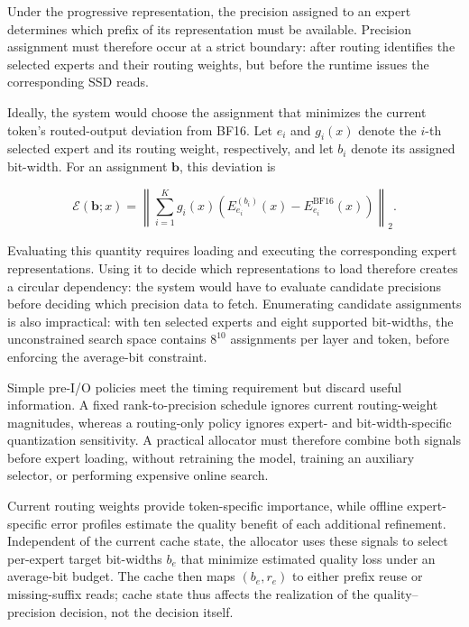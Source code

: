 \documentclass[sigconf, nonacm]{acmart}
\begin{document}
Under the progressive representation, the precision assigned to an
expert determines which prefix of its representation must be
available. Precision assignment must therefore occur at a strict
boundary: after routing identifies the selected experts and their
routing weights, but before the runtime issues the corresponding SSD
reads.

Ideally, the system would choose the assignment that minimizes the
current token's routed-output deviation from BF16. Let \(e_i\) and
\(g_i(x)\) denote the \(i\)-th selected expert and its routing weight,
respectively, and let \(b_i\) denote its assigned bit-width. For an
assignment \(\mathbf{b}\), this deviation is

\begin{equation}
\label{eq:exact-current-token-error}
    \mathcal{E}(\mathbf{b};x)
    =
    \left\|
        \sum_{i=1}^{K}
        g_i(x)
        \left(
            E_{e_i}^{(b_i)}(x)
            -
            E_{e_i}^{\mathrm{BF16}}(x)
        \right)
    \right\|_2.
\end{equation}

Evaluating this quantity requires loading and executing the
corresponding expert representations. Using it to decide which
representations to load therefore creates a circular dependency: the
system would have to evaluate candidate precisions before deciding
which precision data to fetch. Enumerating candidate assignments is also impractical: with ten
selected experts and eight supported bit-widths, the unconstrained
search space contains \(8^{10}\) assignments per layer and token,
before enforcing the average-bit constraint.

Simple pre-I/O policies meet the timing requirement but discard useful information. A fixed
rank-to-precision schedule ignores current routing-weight magnitudes,
whereas a routing-only policy ignores expert- and bit-width-specific
quantization sensitivity. A practical allocator must therefore combine
both signals before expert loading, without retraining the model,
training an auxiliary selector, or performing expensive online search.

Current routing weights provide token-specific importance, while
offline expert-specific error profiles estimate the quality benefit of
each additional refinement. Independent of the current cache state,
the allocator uses these signals to select per-expert target bit-widths
\(b_e\) that minimize estimated quality loss under an average-bit
budget. The cache then maps \((b_e,r_e)\) to either prefix reuse or
missing-suffix reads; cache state thus affects the realization of the
quality--precision decision, not the decision itself.
\end{document}
